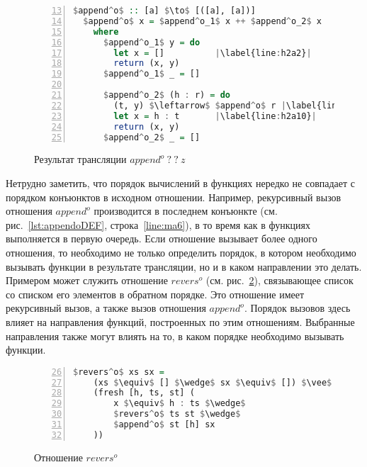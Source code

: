 \documentclass[conference,a4paper,american,russian]{IEEEtran}
\begin{document}
\begin{figure}[h!]
  \begin{center}
  \begin{minipage}{0.4\textwidth}
    \begin{lstlisting}[language=Haskell, frame=single, numbers=left, numberstyle=\small, firstnumber=13, escapechar=|]
  $append^o$ :: [a] $\to$ [([a], [a])]
  $append^o$ x = $append^o_1$ x ++ $append^o_2$ x
    where
      $append^o_1$ y = do
        let x = []          |\label{line:h2a2}|
        return (x, y)
      $append^o_1$ _ = []

      $append^o_2$ (h : r) = do
        (t, y) $\leftarrow$ $append^o$ r |\label{line:h2a9}|
        let x = h : t       |\label{line:h2a10}|
        return (x, y)
      $append^o_2$ _ = []
      \end{lstlisting}
  \end{minipage}
  \end{center}
  \caption{Результат трансляции $append^o \ ? \ ? \ z$ }
  \label{lst:appendoBWD}
\end{figure}

Нетрудно заметить, что порядок вычислений в функциях нередко не совпадает с порядком конъюнктов в исходном отношении.
Например, рекурсивный вызов отношения $append^o$ производится в последнем конъюнкте (см. рис.~\ref{lst:appendoDEF}, строка~\ref{line:ma6}), в то время как в функциях выполняется в первую очередь.
Если отношение вызывает более одного отношения, то необходимо не только определить порядок, в котором необходимо вызывать функции в результате трансляции, но и в каком направлении это делать.
Примером может служить отношение $revers^o$ (см. рис.~\ref{lst:reversoDEF}), связывающее список со списком его элементов в обратном порядке.
Это отношение имеет рекурсивный вызов, а также вызов отношения $append^o$.
Порядок вызовов здесь влияет на направления функций, построенных по этим отношениям.
Выбранные направления также могут влиять на то, в каком порядке необходимо вызывать функции.

\begin{figure}[h!]
  \begin{center}
  \begin{minipage}{0.35\textwidth}
  \begin{lstlisting}[language=Haskell, frame=single, numbers=left,numberstyle=\small, firstnumber=26,escapechar=|]
  $revers^o$ xs sx =
    (xs $\equiv$ [] $\wedge$ sx $\equiv$ []) $\vee$
    (fresh [h, ts, st] (
        x $\equiv$ h : ts $\wedge$
        $revers^o$ ts st $\wedge$
        $append^o$ st [h] sx
    ))
    \end{lstlisting}
  \end{minipage}
  \end{center}
  \caption{Отношение $revers^o$}
  \label{lst:reversoDEF}
\end{figure}
\end{document}
